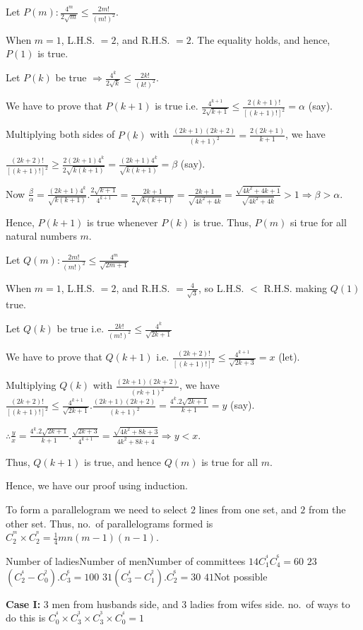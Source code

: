   Let $P(m): \frac{4^m}{2\sqrt{m}}\leq \frac{2m!}{(m!)^2}$.

  When $m = 1$, L.H.S. $= 2$, and R.H.S. $= 2$. The equality holds, and hence, $P(1)$ is true.

  Let $P(k)$ be true $\Rightarrow \frac{4^k}{2\sqrt{k}}\leq \frac{2k!}{(k!)^2}$.

  We have to prove that $P(k + 1)$ is true i.e. $\frac{4^{k + 1}}{2\sqrt{k + 1}}\leq\frac{2(k + 1)!}{[(k +
      1)!]^2} = \alpha$ (say).

  Multiplying both sides of $P(k)$ with $\frac{(2k + 1)(2k + 2)}{(k + 1)^2} = \frac{2(2k + 1)}{k + 1}$, we
  have

  $\frac{(2k + 2)!}{[(k + 1)!]^2}\geq \frac{2(2k + 1)4^k}{2\sqrt{k(k + 1)}} = \frac{(2k + 1)4^k}{\sqrt{k(k +
      1)}} = \beta$ (say).

  Now $\frac{\beta}{\alpha} = \frac{(2k + 1)4^k}{\sqrt{k(k + 1)}}.\frac{2\sqrt{k + 1}}{4^{k + 1}} = \frac{2k
  + 1}{2\sqrt{k(k + 1)}} = \frac{2k + 1}{\sqrt{4k^2 + 4k}} = \frac{\sqrt{4k^2 + 4k + 1}}{\sqrt{4k^2 + 4k}} >
  1 \Rightarrow \beta > \alpha$.

  Hence, $P(k + 1)$ is true whenever $P(k)$ is true. Thus, $P(m)$ si true for all natural numbers $m$.

  Let $Q(m): \frac{2m!}{(m!)^2}\leq \frac{4^m}{\sqrt{2m + 1}}$

  When $m = 1$, L.H.S. $= 2$, and R.H.S. $= \frac{4}{\sqrt{3}}$, so L.H.S. $<$ R.H.S. making $Q(1)$ true.

  Let $Q(k)$ be true i.e. $\frac{2k!}{(m!)^2}\leq \frac{4^k}{\sqrt{2k + 1}}$

  We have to prove that $Q(k + 1)$ i.e. $\frac{(2k + 2)!}{[(k + 1)!]^2}\leq\frac{4^{k + 1}}{\sqrt{2k + 3}} =
  x$ (let).

  Multiplying $Q(k)$ with $\frac{(2k + 1)(2k + 2)}{(rk + 1)^2}$, we have $\frac{(2k + 2)!}{[(k + 1)!]^2}\leq
  \frac{4^{k + 1}}{\sqrt{2k + 1}}.\frac{(2k + 1)(2k + 2)}{(k + 1)^2} = \frac{4^k.2\sqrt{2k + 1}}{k + 1} = y$
  (say).

  $\therefore \frac{y}{x} = \frac{4^k.2\sqrt{2k + 1}}{k + 1}.\frac{\sqrt{2k + 3}}{4^{k + 1}} =
  \frac{\sqrt{4k^2 + 8k + 3}}{4k^2 + 8k + 4}\Rightarrow y < x$.

  Thus, $Q(k + 1)$ is true, and hence $Q(m)$ is true for all $m$.

  Hence, we have our proof using induction.
\item To form a parallelogram we need to select $2$ lines from one set, and $2$ from the other set. Thus,
  no.\ of parallelograms formed is $C_2^^m\times C_2^^n = \frac{1}{4}mn(m - 1)(n - 1)$.
\item \starttabulate[|c|c|l|]
  \NC Number of ladies\NC Number of men\NC Number of committees\NC\NR
  \NC $1$\NC $4$\NC $C_1^^4C_4^^6 = 60$\NC\NR
  \NC $2$\NC $3$\NC $(C_2^^4 - C_0^^2).C_3^^6 = 100$\NC\NR
  \NC $3$\NC $1$\NC $(C_3^^4 - C_1^^2).C_2^^6 = 30$\NC\NR
  \NC $4$\NC $1$\NC Not possible\NC\NR
\stoptabulate
\item {\bf Case I:} $3$ men from husband\symbol[rightquote]s side, and $3$ ladies from wife\symbol[rightquote]s side. no.\ of ways to do this is
  $C_0^^4\times C_3^^3\times C_3^^3\times C_0^^4 = 1$

